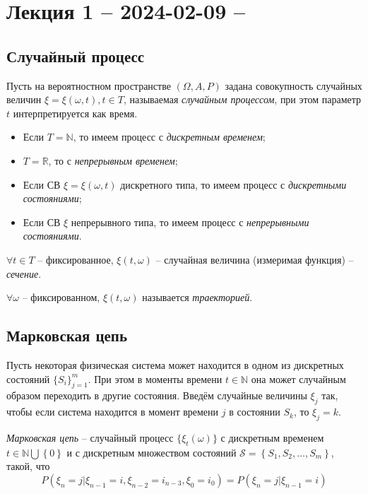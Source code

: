 \section{Лекция 1 -- 2024-02-09 -- }

\subsection{Случайный процесс}

\begin{definition}
  Пусть на вероятностном пространстве $(\Omega, A, P)$ задана совокупность случайных величин
  $\xi = \xi(\omega, t), t \in T$, называемая \emph{случайным процессом}, при этом параметр 
  $t$ интерпретируется как время.

  \begin{itemize}
    \item Если $T = \mathbb{N}$, то имеем процесс с \emph{дискретным временем};
    \item $T = \mathbb{R}$, то с \emph{непрерывным временем};
    \item Если СВ $\xi=\xi(\omega, t)$ дискретного типа, то имеем процесс с \emph{дискретными состояниями};
    \item Если СВ $\xi$ непрерывного типа, то имеем процесс с \emph{непрерывными состояниями}.
  \end{itemize}

  $\forall t \in T$ -- фиксированное, $\xi(t, \omega)$ -- случайная величина (измеримая функция)
  -- \emph{сечение}.

  $\forall \omega$ -- фиксированном, $\xi(t, \omega)$ называется \emph{траекторией}.
\end{definition}



\subsection{Марковская цепь}

\begin{definition}
  Пусть некоторая физическая система может находится в одном из дискретных состояний
  $\{S_i\}_{j=1}^m$. При этом в моменты времени $t \in \mathbb{N}$ она может случайным образом
  переходить в другие состояния. Введём случайные величины $\xi_j$ так, чтобы если система
  находится в момент времени $j$ в состоянии $S_k$, то $\xi_j = k$.

  \emph{Марковская цепь} -- случайный процесс $\{\xi_t(\omega)\}$ с дискретным временем
  $t \in \mathbb{N} \bigcup \left\{ 0 \right\} $ и с дискретным множеством состояний
  $\mathcal{S} = \left\{ S_1, S_2, \dots, S_m \right\} $, такой, что
  \[
    P(\xi_n = j | \xi_{n-1} = i, \xi_{n-2} = i_{n-3}, \xi_0 = i_0) = P(\xi_n=j | \xi_{n-1} = i)
  \]
\end{definition}

